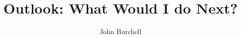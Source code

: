 \documentclass{article}
\begin{document}
\title{Outlook: What Would I do Next?}

\author{John Burchell}
\maketitle
\end{document}
